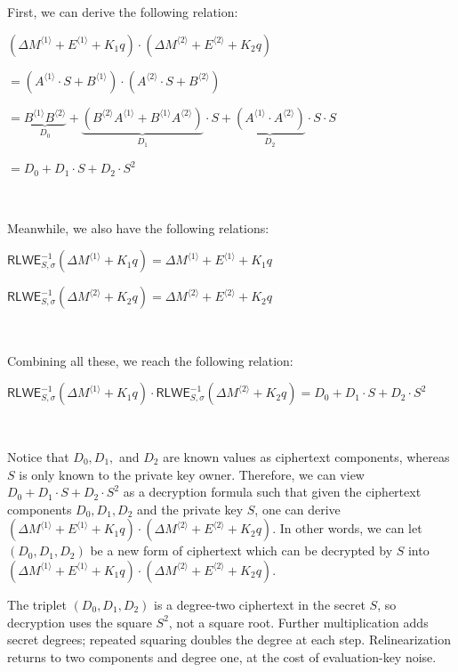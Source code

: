 First, we can derive the following relation: 

$(\Delta M^{\langle 1 \rangle} + E^{\langle 1 \rangle} + K_1q) \cdot (\Delta M^{\langle 2 \rangle} + E^{\langle 2 \rangle} + K_2q)$

$ = (A^{\langle 1 \rangle} \cdot S + B^{\langle 1 \rangle}) \cdot (A^{\langle 2 \rangle} \cdot S + B^{\langle 2 \rangle})$

$ = \underbrace{B^{\langle 1 \rangle}B^{\langle 2 \rangle}}_{D_0}  + \underbrace{(B^{\langle 2 \rangle}A^{\langle 1 \rangle} + B^{\langle 1 \rangle}A^{\langle 2 \rangle})}_{D_1} \cdot S + \underbrace{(A^{\langle 1 \rangle} \cdot A^{\langle 2 \rangle})}_{D_2} \cdot S \cdot S $



$= D_0 + D_1\cdot S + D_2\cdot S^2$



$ $

Meanwhile, we also have the following relations:

$\textsf{RLWE}_{S, \sigma}^{-1}(\Delta M^{\langle 1 \rangle} + K_1q) = \Delta M^{\langle 1 \rangle} + E^{\langle 1 \rangle} + K_1q$

$\textsf{RLWE}_{S, \sigma}^{-1}(\Delta M^{\langle 2 \rangle} + K_2q) = \Delta M^{\langle 2 \rangle} + E^{\langle 2 \rangle} + K_2q$

$ $

Combining all these, we reach the following relation: 

$\textsf{RLWE}_{S, \sigma}^{-1}(\Delta M^{\langle 1 \rangle} + K_1q) \cdot \textsf{RLWE}_{S, \sigma}^{-1}(\Delta M^{\langle 2 \rangle} + K_2q) = D_0 + D_1\cdot S + D_2\cdot S^2$

$ $

Notice that $D_0, D_1,$ and $D_2$ are known values as ciphertext components, whereas $S$ is only known to the private key owner. Therefore, we can view $D_0 + D_1\cdot S + D_2\cdot S^2$ as a decryption formula such that given the ciphertext components $D_0, D_1, D_2$ and the private key $S$, one can derive $(\Delta M^{\langle 1 \rangle} + E^{\langle 1 \rangle} + K_1q) \cdot (\Delta M^{\langle 2 \rangle} + E^{\langle 2 \rangle} + K_2q)$. In other words, we can let $(D_0, D_1, D_2)$ be a new form of ciphertext which can be decrypted by $S$ into $(\Delta M^{\langle 1 \rangle} + E^{\langle 1 \rangle} + K_1q) \cdot (\Delta M^{\langle 2 \rangle} + E^{\langle 2 \rangle} + K_2q)$. 

The triplet $(D_0,D_1,D_2)$ is a degree-two ciphertext in the secret $S$, so decryption uses the square $S^2$, not a square root. Further multiplication adds secret degrees; repeated squaring doubles the degree at each step. Relinearization returns to two components and degree one, at the cost of evaluation-key noise.




